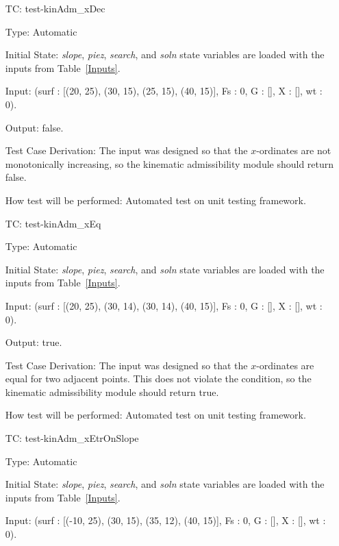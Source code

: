 \documentclass[12pt, titlepage]{article}
\newcounter{utestnum} %
\begin{document}
\begin{enumerate}[label=TC\arabic*:,ref={\arabic*}]
	
	\item [TC\refstepcounter{utestnum}\theutestnum: \label{TC_KinAdmXDec}] 
	test-kinAdm\_xDec
	
	Type: Automatic
	
	Initial State: \textit{slope}, \textit{piez}, \textit{search}, and 
	\textit{soln} state variables are loaded with the inputs from 
	Table~\ref{Inputs}.
	
	Input: (surf : [(20, 25), (30, 15), (25, 15), (40, 15)], Fs : 0, G : [], X 
	: [], wt : 0).
	
	Output: false.
	
	Test Case Derivation: The input was designed so that the $x$-ordinates are 
	not monotonically increasing, so the kinematic admissibility module should 
	return false.
	
	How test will be performed: Automated test on unit testing framework.
	
	\item [TC\refstepcounter{utestnum}\theutestnum: \label{TC_KinAdmXEq}] 
	test-kinAdm\_xEq
	
	Type: Automatic
	
	Initial State: \textit{slope}, \textit{piez}, \textit{search}, and 
	\textit{soln} state variables are loaded with the inputs from 
	Table~\ref{Inputs}.
	
	Input: (surf : [(20, 25), (30, 14), (30, 14), (40, 15)], Fs : 0, G : [], X 
	: [], wt : 0).
	
	Output: true.
	
	Test Case Derivation: The input was designed so that the $x$-ordinates are 
	equal for two adjacent points. This does not violate the condition, so the 
	kinematic admissibility module should return true.
	
	How test will be performed: Automated test on unit testing framework.
	
	\item [TC\refstepcounter{utestnum}\theutestnum: 
	\label{TC_KinAdmXetrOnSlope}] 
	test-kinAdm\_xEtrOnSlope
	
	Type: Automatic
	
	Initial State: \textit{slope}, \textit{piez}, \textit{search}, and 
	\textit{soln} state variables are loaded with the inputs from 
	Table~\ref{Inputs}.
	
	Input: (surf : [(-10, 25), (30, 15), (35, 12), (40, 15)], Fs : 0, G : [], X 
	: [], wt : 0).
	

\end{enumerate}
\end{document}
